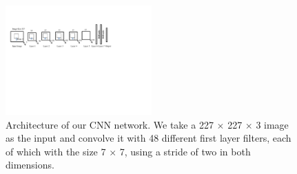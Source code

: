 \documentclass[11pt,twocolumn,twoside]{IEEEtran}
\begin{document}
\begin{figure}[h]
\includegraphics[width=0.5\textwidth]{fig12.pdf}
\centering
\caption{Architecture of our CNN network. We take a 227 $\times$ 227 $\times$ 3 image as the input and convolve it with 48 different first layer filters, each of which with the size 7 $\times$
7, using a stride of two in both dimensions.} \label{fig:fig6}
\end{figure}
\end{document}
